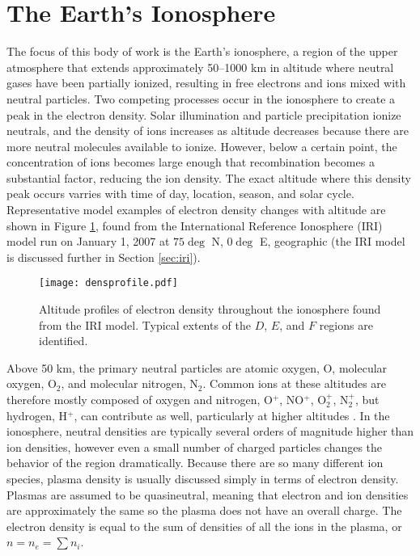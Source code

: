 \section{The Earth's Ionosphere}
\label{sec:ionosphere}
The focus of this body of work is the Earth's ionosphere, a region of the upper atmosphere that extends approximately 50--1000 km in altitude where neutral gases have been partially ionized, resulting in free electrons and ions mixed with neutral particles.  Two competing processes occur in the ionosphere to create a peak in the electron density.  Solar illumination and particle precipitation ionize neutrals, and the density of ions increases as altitude decreases because there are more neutral molecules available to ionize.  However, below a certain point, the concentration of ions becomes large enough that recombination becomes a substantial factor, reducing the ion density.  The exact altitude where this density peak occurs varries with time of day, location, season, and solar cycle.  Representative model examples of electron density changes with altitude are shown in Figure \ref{fig:densprofile}, found from the International Reference Ionosphere (IRI) model run on January 1, 2007 at \(75\deg\) N, \(0\deg\) E, geographic (the IRI model is discussed further in Section \ref{sec:iri}).

\begin{figure}
	\centering
	\texttt{[image: densprofile.pdf]}
	\caption[Ionosphere density profiles]{Altitude profiles of electron density throughout the ionosphere found from the IRI model.  Typical extents of the \(D\), \(E\), and \(F\) regions are identified.}
	\label{fig:densprofile}
\end{figure}

Above 50 km, the primary neutral particles are atomic oxygen, O, molecular oxygen, O\(_2\), and molecular nitrogen, N\(_2\).  Common ions at these altitudes are therefore mostly composed of oxygen and nitrogen, O\(^+\), NO\(^+\), O\(_2^+\), N\(_2^+\), but hydrogen, H\(^+\), can contribute as well, particularly at higher altitudes \citep{Kelley2009}.  In the ionosphere, neutral densities are typically several orders of magnitude higher than ion densities, however even a small number of charged particles changes the behavior of the region dramatically.  Because there are so many different ion species, plasma density is usually discussed simply in terms of electron density.  Plasmas are assumed to be quasineutral, meaning that electron and ion densities are approximately the same so the plasma does not have an overall charge.  The electron density is equal to the sum of densities of all the ions in the plasma, or \(n = n_e = \sum n_i\).

